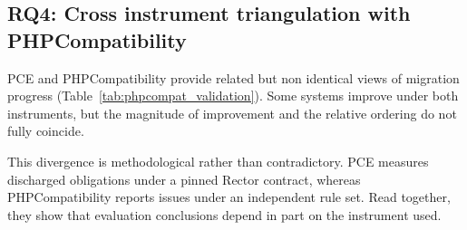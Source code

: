 \subsection{RQ4: Cross instrument triangulation with PHPCompatibility}
\label{sec:phpcompat_results}

PCE and PHPCompatibility provide related but non identical views of
migration progress
(Table~\ref{tab:phpcompat_validation}). Some systems improve under both
instruments, but the magnitude of improvement and the relative ordering do
not fully coincide.

This divergence is methodological rather than contradictory. PCE measures
discharged obligations under a pinned Rector contract, whereas
PHPCompatibility reports issues under an independent rule set. Read
together, they show that evaluation conclusions depend in part on the
instrument used.

